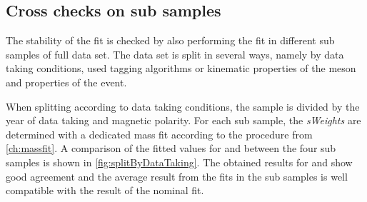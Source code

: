 \subsection{Cross checks on sub samples}
\label{sec:valOnSub Sample}

The stability of the fit is checked by also performing the fit in different sub samples of full data set.
The data set is split in several ways, namely by data taking conditions, used tagging algorithms or kinematic properties of the \Bz meson and properties of the event.

When splitting according to data taking conditions, the \BdToDpi sample is divided by the year of data taking and magnetic polarity.
For each sub sample, the \emph{sWeights} are determined with a dedicated mass fit according to the procedure from \cref{ch:massfit}.
A comparison of the fitted values for \Sf and \Sfbar between the four sub samples is shown in \cref{fig:splitByDataTaking}.
The obtained results for \Sf and \Sfbar show good agreement and the average result from the fits in the sub samples is well compatible with the result of the nominal fit.

